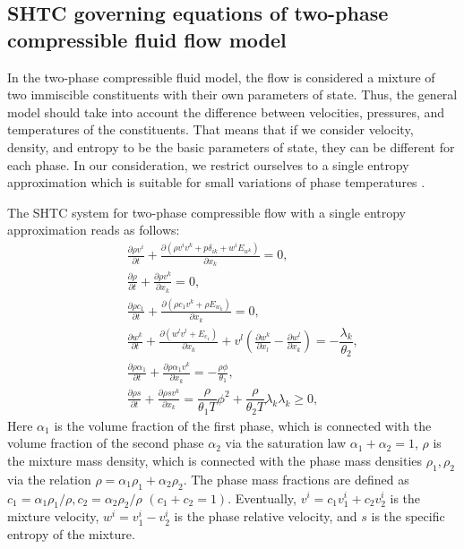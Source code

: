 \documentclass[3p,times,table]{article}
\begin{document}
\subsection{SHTC governing equations of two-phase compressible fluid flow model}
\label{sec.twophase}

In the two-phase compressible fluid model, the flow is considered  
a mixture of two 
immiscible constituents with their own parameters of state. Thus, the general model should take into 
account the difference between velocities, pressures, and temperatures of the 
constituents. That means that if 
we consider  velocity, density, and entropy to be the basic parameters of 
state, they can be 
different for each phase. In our consideration, we restrict ourselves to a 
single entropy 
approximation which is suitable for small variations of phase temperatures 
\cite{Romenski2016}.

The SHTC system for two-phase compressible flow with a single entropy approximation 
\cite{RomDrikToro2010} reads as follows:
\begin{subequations}\label{eqn.HPRFF}
\begin{eqnarray}
&&\displaystyle\frac{\partial \rho v^i}{\partial t}+\frac{\partial 
	(\rho v^i v^k + p \delta_{ik} + w^iE_{w^k} )}{\partial x_k}=0, 
\label{eqn.momentumFF}\\[2mm]
&& \frac{\partial \rho}{\partial t}+\frac{\partial \rho v^k}{\partial 
	x_k}=0,\label{eqn.contiFF}\\[2mm]
&& \frac{\partial \rho c_1}{\partial t}+\frac{\partial (\rho c_1 v^k+\rho E_{w_k})}{\partial 
	x_k}=0,\label{eqn.contiFF1}\\[2mm]
&&\displaystyle\frac{\partial w^k}{\partial t}+\frac{\partial(w^lv^l+E_{c_1})}{\partial x_k}+v^l\left(\frac{\partial w^k}{\partial x_l}-
\frac{\partial w^l}{\partial x_k}\right)=-\dfrac{ \lambda_{k} }{\theta_2},\label{eqn.relvel}\\[2mm]
&& \frac{\partial \rho \alpha_1}{\partial t}+\frac{\partial \rho \alpha_1 v^k }{\partial x_k}=-\frac{\rho \phi}{\theta_1},\label{eqn.alphaFF}\\[2mm]
&&\displaystyle\frac{\partial \rho s}{\partial t}+\frac{\partial \rho 
	s v^k }{\partial x_k}=\dfrac{\rho}{\theta_1 T}\phi^2 +
\dfrac{\rho}{\theta_2 T}\lambda_k \lambda_k \geq0, 
\label{eqn.entropyFF}
\end{eqnarray}
\end{subequations}
Here $\alpha_1$ is the volume fraction of the first phase, which is connected 
with the volume 
fraction of the second phase $\alpha_2$ via the saturation law 
$\alpha_1+\alpha_2=1$, $\rho$ is the mixture mass density, which is connected 
with the phase mass densities $\rho_1,\rho_2$ via the relation 
$\rho=\alpha_1\rho_1+\alpha_2\rho_2$. The phase mass fractions are defined as 
$c_1=\alpha_1 \rho_1/\rho, c_2=\alpha_2 \rho_2/\rho$  $(c_1+c_2=1)$. 
Eventually, 
$v^i=c_1v_1^i+c_2v_2^i$ is the mixture velocity, $w^i=v_1^i-v_2^i$ is the 
phase relative velocity, and $s$ is the specific entropy of the mixture.
\end{document}
